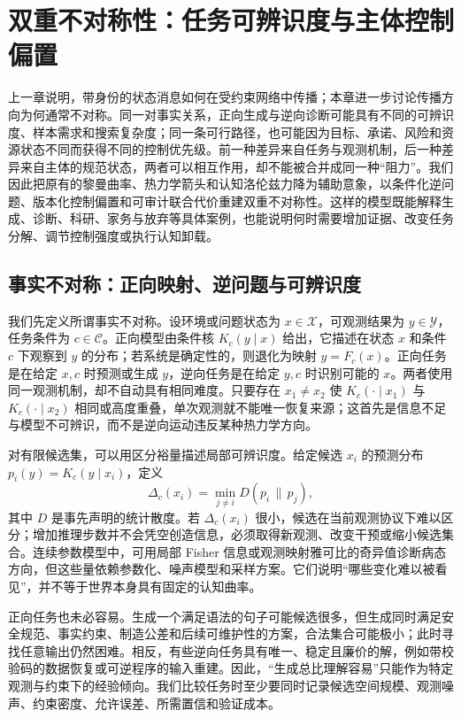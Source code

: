 \chapter{双重不对称性：任务可辨识度与主体控制偏置}
\label{chap:dual_asymmetry}

上一章说明，带身份的状态消息如何在受约束网络中传播；本章进一步讨论传播方向为何通常不对称。同一对事实关系，正向生成与逆向诊断可能具有不同的可辨识度、样本需求和搜索复杂度；同一条可行路径，也可能因为目标、承诺、风险和资源状态不同而获得不同的控制优先级。前一种差异来自任务与观测机制，后一种差异来自主体的规范状态，两者可以相互作用，却不能被合并成同一种“阻力”。我们因此把原有的黎曼曲率、热力学箭头和认知洛伦兹力降为辅助意象，以条件化逆问题、版本化控制偏置和可审计联合代价重建双重不对称性。这样的模型既能解释生成、诊断、科研、家务与放弃等具体案例，也能说明何时需要增加证据、改变任务分解、调节控制强度或执行认知卸载。

\section{事实不对称：正向映射、逆问题与可辨识度}
\label{sec:factual_asymmetry}

我们先定义所谓事实不对称。设环境或问题状态为 $x\in\mathcal{X}$，可观测结果为 $y\in\mathcal{Y}$，任务条件为 $c\in\mathcal{C}$。正向模型由条件核 $K_c(y\mid x)$ 给出，它描述在状态 $x$ 和条件 $c$ 下观察到 $y$ 的分布；若系统是确定性的，则退化为映射 $y=F_c(x)$。正向任务是在给定 $x,c$ 时预测或生成 $y$，逆向任务是在给定 $y,c$ 时识别可能的 $x$。两者使用同一观测机制，却不自动具有相同难度。只要存在 $x_1\neq x_2$ 使 $K_c(\cdot\mid x_1)$ 与 $K_c(\cdot\mid x_2)$ 相同或高度重叠，单次观测就不能唯一恢复来源；这首先是信息不足与模型不可辨识，而不是逆向运动违反某种热力学方向。

对有限候选集，可以用区分裕量描述局部可辨识度。给定候选 $x_i$ 的预测分布 $p_i(y)=K_c(y\mid x_i)$，定义
\begin{equation}
\Delta_c(x_i)=\min_{j\neq i}D\!\left(p_i\,\|\,p_j\right),
\end{equation}
其中 $D$ 是事先声明的统计散度。若 $\Delta_c(x_i)$ 很小，候选在当前观测协议下难以区分；增加推理步数并不会凭空创造信息，必须取得新观测、改变干预或缩小候选集合。连续参数模型中，可用局部 Fisher 信息或观测映射雅可比的奇异值诊断病态方向，但这些量依赖参数化、噪声模型和采样方案。它们说明“哪些变化难以被看见”，并不等于世界本身具有固定的认知曲率。

正向任务也未必容易。生成一个满足语法的句子可能候选很多，但生成同时满足安全规范、事实约束、制造公差和后续可维护性的方案，合法集合可能极小；此时寻找任意输出仍然困难。相反，有些逆向任务具有唯一、稳定且廉价的解，例如带校验码的数据恢复或可逆程序的输入重建。因此，“生成总比理解容易”只能作为特定观测与约束下的经验倾向。我们比较任务时至少要同时记录候选空间规模、观测噪声、约束密度、允许误差、所需置信和验证成本。

